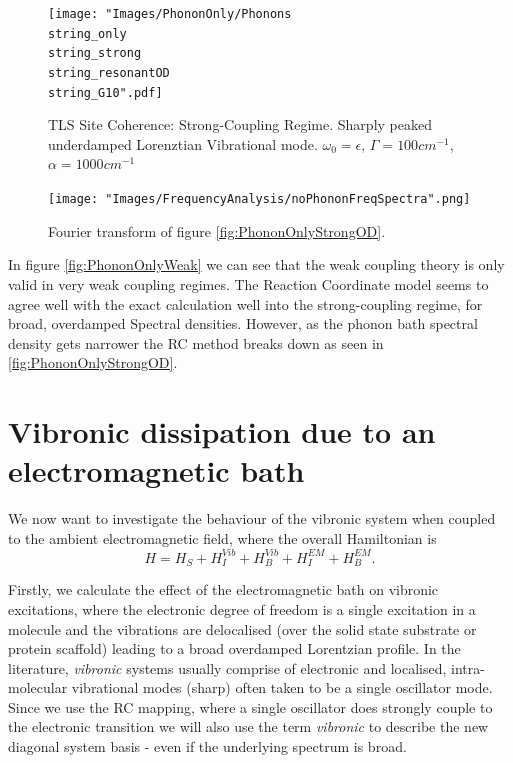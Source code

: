 \documentclass[]{article}
\begin{document}
\begin{figure}
	\centering
	\begin{minipage}[b]{0.45\textwidth}
		\texttt{[image: "Images/PhononOnly/Phonons\\string\_only\\string\_strong\\string\_resonantOD\\string\_G10".pdf]}
		\caption{TLS Site Coherence: Strong-Coupling Regime. Sharply peaked underdamped Lorenztian Vibrational mode. $\omega_0=\epsilon$, $\Gamma=100cm^{-1}$, $\alpha=1000cm^{-1}$}
		\label{fig:PhononOnlyStrongOD}
	\end{minipage}
	\begin{minipage}[b]{0.45\textwidth}
		\texttt{[image: "Images/FrequencyAnalysis/noPhononFreqSpectra".png]}\caption{Fourier transform of figure \ref{fig:PhononOnlyStrongOD}.}
		\label{fig:PhononOnlySpectra}
	\end{minipage}
\end{figure}
In figure \ref{fig:PhononOnlyWeak} we can see that the weak coupling theory is only valid in very weak coupling regimes. The Reaction Coordinate model seems to agree well with the exact calculation well into the strong-coupling regime, for broad, overdamped Spectral densities. However, as the phonon bath spectral density gets narrower the RC method breaks down as seen in \ref{fig:PhononOnlyStrongOD}.
\section{Vibronic dissipation due to an electromagnetic bath}
We now want to investigate the behaviour of the vibronic system when coupled to the ambient electromagnetic field, where the overall Hamiltonian is
\begin{equation}
H = H_S + H_I^{Vib} + H_B^{Vib} + H_I^{EM}+ H_B^{EM}.
\end{equation}

Firstly, we calculate the effect of the electromagnetic bath on vibronic excitations, where the electronic degree of freedom is a single excitation in a molecule and the vibrations are delocalised (over the solid state substrate or protein scaffold) leading to a broad overdamped Lorentzian profile. In the literature, \textit{vibronic} systems usually comprise of electronic and localised, intra-molecular vibrational modes (sharp) often taken to be a single oscillator mode. Since we use the RC mapping, where a single oscillator does strongly couple to the electronic transition we will also use the term \textit{vibronic} to describe the new diagonal system basis - even if the underlying spectrum is broad.
\end{document}
